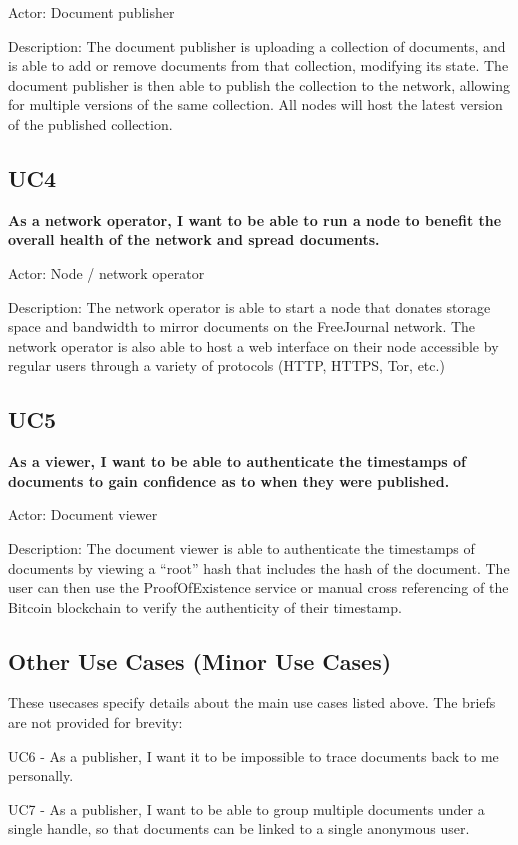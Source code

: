 \documentclass[letterpaper,10pt,oneside]{sphinxmanual}
\begin{document}
Actor: Document publisher

Description: The document publisher is uploading a collection of documents, and is able to add or remove documents from that
collection, modifying its state.  The document publisher is then able to publish the collection to the network, allowing for
multiple versions of the same collection.  All nodes will host the latest version of the published collection.


\subsection{UC4}
\label{requirements:uc4}
\textbf{As a network operator, I want to be able to run a node to benefit the overall health of the network and spread documents.}

Actor: Node / network operator

Description: The network operator is able to start a node that donates storage space and bandwidth to mirror documents on the
FreeJournal network.  The network operator is also able to host a web interface on their node accessible by regular users
through a variety of protocols (HTTP, HTTPS, Tor, etc.)


\subsection{UC5}
\label{requirements:uc5}
\textbf{As a viewer, I want to be able to authenticate the timestamps of documents to gain confidence as to when they were published.}

Actor: Document viewer

Description: The document viewer is able to authenticate the timestamps of documents by viewing a ``root'' hash that includes the
hash of the document.  The user can then use the ProofOfExistence service or manual cross referencing of the Bitcoin blockchain
to verify the authenticity of their timestamp.


\subsection{Other Use Cases (Minor Use Cases)}
\label{requirements:other-use-cases-minor-use-cases}
These usecases specify details about the main use cases listed above.  The briefs are not provided for brevity:

UC6 - As a publisher, I want it to be impossible to trace documents back to me personally.

UC7 - As a publisher, I want to be able to group multiple documents under a single handle, so that documents can be linked to a single anonymous user.
\end{document}
